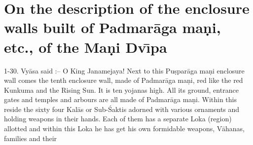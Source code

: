 \chapter{On the description of the enclosure walls built of Padmar\=aga ma\d{n}i, etc., of the Ma\d{n}i Dv\={\i}pa}

1-30. Vy\=asa said :-- O King Janamejaya! Next to this Pu\d{s}par\=aga ma\d{n}i enclosure wall comes the tenth enclosure wall, made of Padmar\=aga ma\d{n}i, red like the red Kunkuma and the Rising Sun. It is ten yojanas high. All its ground, entrance gates and temples and arbours are all made of Padmar\=aga ma\d{n}i. Within this reside the sixty four Kal\=as or Sub-\'Saktis adorned with various ornaments and holding weapons in their hands. Each of them has a separate Loka (region) allotted and within this Loka he has get his own formidable weapons, V\=ahanas, families and their

